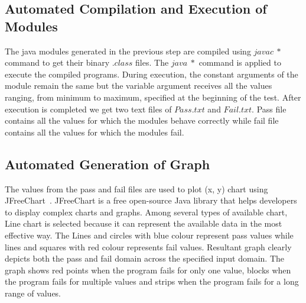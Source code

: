 \subsection{Automated Compilation and Execution of Modules}
The java modules generated in the previous step are compiled using $javac~*$ command to get their binary $.class$ files. The $java~*$ command is applied to execute the compiled programs. During execution, the constant arguments of the module remain the same but the variable argument receives all the values ranging, from minimum to maximum, specified at the beginning of the test. After execution is completed we get two text files of $Pass.txt$ and $Fail.txt$. Pass file contains all the values for which the modules behave correctly while fail file contains all the values for which the modules fail.

\subsection{Automated Generation of Graph}
The values from the pass and fail files are used to plot (x, y) chart using JFreeChart~\cite{gilbert2008jfreechart}. JFreeChart is a free open-source Java library that helps developers to display complex charts and graphs. Among several types of available chart, Line chart is selected because it can represent the available data in the most effective way. The Lines and circles with blue colour represent pass values while lines and squares with red colour represents fail values. Resultant graph clearly depicts both the pass and fail domain across the specified input domain. The graph shows red points when the program fails for only one value, blocks when the program fails for multiple values and strips when the program fails for a long range of values.%








